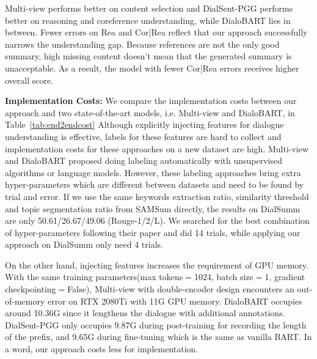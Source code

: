 Multi-view performs better on content selection and 
DialSent-PGG performs better on reasoning and coreference understanding, 
while DialoBART lies in between. 
Fewer errors on Rea and Cor|Rea reflect that our approach 
successfully narrows the understanding gap.
Because references are not the only good summary, high missing content 
doesn't mean that the generated summary is unacceptable. 
As a result, the model with fewer Cor|Rea errors receives higher overall score.



\textbf{Implementation Costs:} 
We compare the implementation costs between our approach and two state-of-the-art models, i.e. Multi-view and DialoBART, in Table~\ref{tab:end2endcost}
Although explicitly injecting features for dialogue understanding is effective, labels for these features are hard to collect and implementation costs for these approaches on a new dataset are high. 
Multi-view and DialoBART proposed doing labeling automatically with unsupervised algorithms or language models. However, these labeling approaches bring extra hyper-parameters which are different between datasets and need to be found by trial and error. If we use the same keywords extraction ratio, similarity threshold and topic segmentation ratio from SAMSum directly, the results on DialSumm are only 50.61/26.67/49.06 (Rouge-1/2/L). We searched for the best combination of hyper-parameters following their paper and did 14 trials, while applying our approach on DialSumm only need 4 trials.

On the other hand, injecting features increases the requirement of GPU memory. 
With the same training parameters(max tokens$=$1024, batch size$=$1, gradient checkpointing$=$False), Multi-view with double-encoder design encounters an out-of-memory error on RTX 2080Ti with 11G GPU memory. DialoBART occupies around 10.36G since it lengthens the dialogue with additional annotations. DialSent-PGG only occupies 9.87G during post-training for recording the length of the prefix, and 9.65G during fine-tuning which is the same as vanilla BART.  
In a word, our approach costs less for implementation.

